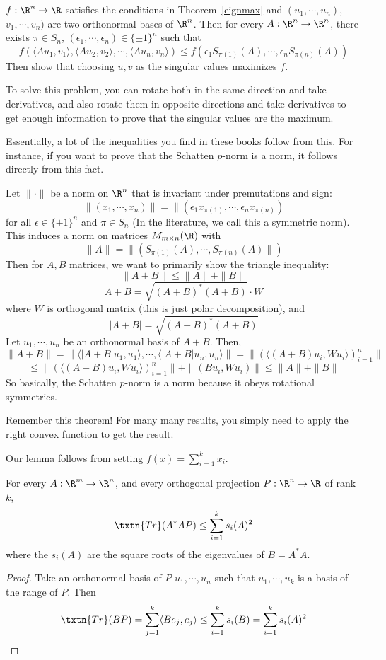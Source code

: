 \begin{ex} $f:\R^n \to \R$ satisfies the conditions in Theorem~\ref{eignmax} and $(u_1, \cdots, u_n)$, $v_1, \cdots, v_n)$ are two orthonormal bases of $\R^n$. Then for every $A: \R^n \to \R^n$, there exists $\pi \in S_n$, $(\epsilon_1, \cdots, \epsilon_n) \in \{\pm 1\}^n$ such that
\[
f(\langle Au_1, v_1\rangle, \langle Au_2, v_2\rangle, \cdots, \langle Au_n, v_n \rangle) \leq f(\epsilon_1S_{\pi(1)}(A), \cdots, \epsilon_nS_{\pi(n)}(A))
\]
Then show that choosing $u, v$ as the singular values maximizes $f$. 
\end{ex}
To solve this problem, you can rotate both in the same direction and take derivatives, and also rotate them in opposite directions and take derivatives to get enough information to prove that the singular values are the maximum. 

Essentially, a lot of the inequalities you find in these books follow from this. For instance, if you want to prove that the Schatten $p$-norm is a norm, it follows directly from this fact. 
\begin{cor}
Let $\|\cdot\|$ be a norm on $\R^n$ that is invariant under premutations and sign: 
\[
\|(x_1, \cdots, x_n)\| = \|(\epsilon_1x_{\pi(1)}, \cdots, \epsilon_nx_{\pi(n)})
\]
for all $\epsilon \in \{\pm 1\}^n$ and $\pi \in S_n$
(In the literature, we call this a symmetric norm). 
This induces a norm on matrices $M_{m \times n}(\R)$ with 
\[
\|A\| = \|(S_{\pi(1)}(A), \cdots, S_{\pi(n)}(A)\|)
\]
Then for $A, B$ matrices, we want to primarily show the triangle inequality: 
\[
\|A + B\| \leq \|A\| + \|B\|
\]
\[
A + B = \sqrt{(A + B)^*(A + B)} \cdot W
\]
where $W$ is orthogonal matrix (this is just polar decomposition), and 
\[
|A + B| = \sqrt{(A + B)^*(A + B)}
\]
Let $u_1, \cdots, u_n$ be an orthonormal basis of $A+ B$. Then, 
\[
\|A + B\| = \|\langle |A + B|u_1, u_1 \rangle, \cdots, \langle |A + B|u_n, u_n \rangle\| = \|(\langle (A +  B)u_i, Wu_i\rangle)_{i = 1}^n \|
\]
\[
\leq \|(\langle (A +  B)u_i, Wu_i\rangle)_{i = 1}^n \| + \|(Bu_i, Wu_i)\| \leq \|A\| + \|B\|
\]
So basically, the Schatten $p$-norm is a norm because it obeys rotational symmetries. 
\end{cor}

Remember this theorem! For many many results, you simply need to apply the right convex function to get the result. 

Our lemma follows from setting $f(x) = \sum_{i = 1}^k x_i$. 
\begin{lem}
For every $A: \R^m \to \R^n$, and every orthogonal projection $P: \R^n \to \R$ of rank $k$, 
\[
\txtn{Tr}(A^*AP) \leq \sum_{i = 1}^k s_i(A)^2
\]
where the $s_i(A)$ are the square roots of the eigenvalues of $B = A^*A$. 
\end{lem}
\begin{proof}
Take an orthonormal basis of $P$ $u_1, \cdots, u_n$ such that $u_1, \cdots, u_k$ is a basis of the range of $P$. Then
\[
\txtn{Tr}(BP) = \sum_{j = 1}^k \langle  Be_j, e_j \rangle \leq \sum_{i = 1}^k s_i(B) = \sum_{i = 1}^k s_i(A)^2
\]
\end{proof}

